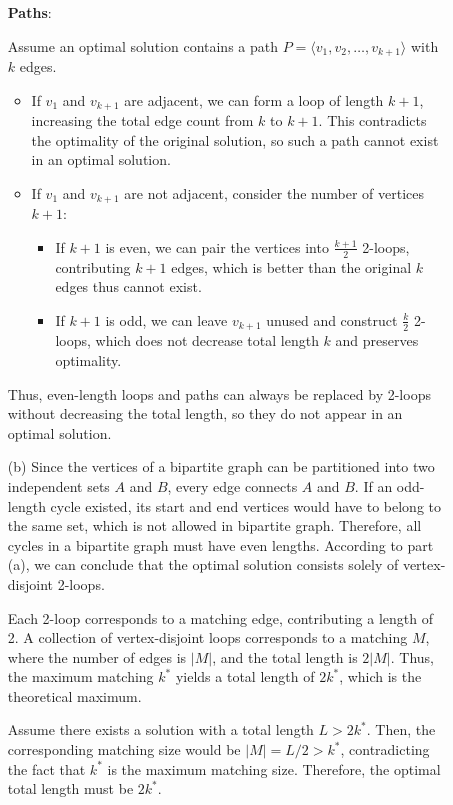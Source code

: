 \documentclass[11pt]{article}
\begin{document}
\begin{description}
\begin{enumerate}
  \textbf{Paths}:

  Assume an optimal solution contains a path \( P = \langle v_1, v_2, \dots, v_{k+1} \rangle \) with \( k \) edges. 
  \begin{itemize}
    \item If \( v_1 \) and \( v_{k+1} \) are adjacent, we can form a loop of length \( k+1 \), increasing the total edge count from \( k \) to \( k+1 \). This contradicts the optimality of the original solution, so such a path cannot exist in an optimal solution.
    \item If \( v_1 \) and \( v_{k+1} \) are not adjacent, consider the number of vertices \( k+1 \):
    \begin{itemize}
      \item If \( k+1 \) is even, we can pair the vertices into \( \frac{k+1}{2} \) 2-loops, contributing \( k+1 \) edges, which is better than the original \( k \) edges thus cannot exist.
      \item If \( k+1 \) is odd, we can leave \( v_{k+1} \) unused and construct \( \frac{k}{2} \) 2-loops, which does not decrease total length \( k \) and preserves optimality.
    \end{itemize}
  \end{itemize}
  Thus, even-length loops and paths can always be replaced by 2-loops without decreasing the total length, so they do not appear in an optimal solution.

  \item[(b)]
  Since the vertices of a bipartite graph can be partitioned into two independent sets \( A \) and \( B \), every edge connects \( A \) and \( B \). If an odd-length cycle existed, its start and end vertices would have to belong to the same set, which is not allowed in bipartite graph. Therefore, all cycles in a bipartite graph must have even lengths. According to part (a), we can conclude that the optimal solution consists solely of vertex-disjoint 2-loops.
  
  Each 2-loop corresponds to a matching edge, contributing a length of 2. A collection of vertex-disjoint loops corresponds to a matching \( M \), where the number of edges is \( |M| \), and the total length is \( 2|M| \). Thus, the maximum matching \( k^* \) yields a total length of \( 2k^* \), which is the theoretical maximum.  

  Assume there exists a solution with a total length \( L > 2k^* \). Then, the corresponding matching size would be \( |M| = L/2 > k^* \), contradicting the fact that \( k^* \) is the maximum matching size. Therefore, the optimal total length must be \( 2k^* \).  


\end{enumerate}
\end{description}
\end{document}
